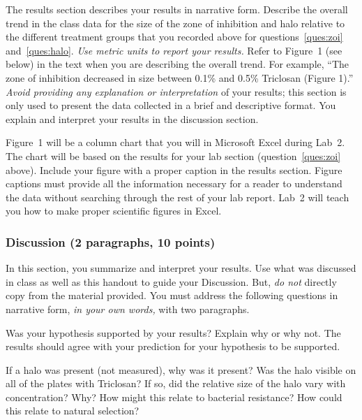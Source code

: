 \documentclass[12pt]{exam}
\begin{document}
The results section describes your results in narrative
form. Describe the overall trend in the class data for the size of the zone of inhibition and halo 
relative to the different treatment groups that you recorded above for questions~\ref{ques:zoi} and~\ref{ques:halo}. \emph{Use metric
units to report your results.} Refer to Figure~1 (see below) in the text when you are describing 
the overall trend. For example, ``The zone of inhibition decreased in
size between 0.1\% and 0.5\% Triclosan (Figure 1).'' \emph{Avoid
providing any explanation or interpretation} of your results; this
section is only used to present the data collected in a brief and
descriptive format. You explain and interpret your results in the discussion section. 


Figure~1 will be a column chart that you will in Microsoft Excel during Lab~2. The chart will
be based on the results for your lab section (question~\ref{ques:zoi} above).%
Include your figure with a proper caption in the results section. Figure captions
must provide all the information necessary for a reader to understand
the data without searching through the rest of your lab report. Lab~2 will teach 
you how to make proper scientific figures in Excel.


\subsubsection*{Discussion (2 paragraphs, 10 points)} 

In this section, you summarize and interpret your results. Use what
was discussed in class as well as this handout to guide
your Discussion. But, \emph{do not} directly copy from the material provided.
You must address the following questions in narrative form, \emph{in your own words,} with two
paragraphs.

Was your hypothesis supported by your results? Explain why or why not. 
The results should agree with your prediction for your hypothesis to be supported. 

If a halo was present (not measured), why was it present? Was the halo visible on all of
the plates with Triclosan? If so, did the relative size of the halo vary
with concentration? Why? How might this relate to bacterial resistance? How could this
relate to natural selection? 
\end{document}
